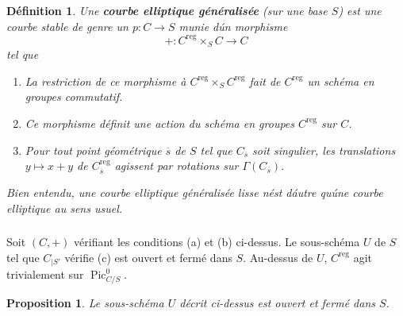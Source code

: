 \documentclass{amsart}
\theoremstyle{plain}
\newtheorem{proposition}[theorem]{Proposition}
\newtheorem{definition}[theorem]{D\'efinition}
\theoremstyle{remark}
\DeclareMathOperator{\Pic}{Pic}
\begin{document}
\begin{definition}
Une \textbf{courbe elliptique g\'en\'eralis\'ee} (sur une base $S$) est une courbe stable
de genre un $p: C \to S$ munie d\'un morphisme
\begin{equation}
+: C^{\mathrm{reg}} \times_S C \to C
\end{equation}
tel que
\begin{enumerate}
\item[(a)] La restriction de ce morphisme \`a $C^{\mathrm{reg}} \times_S C^{\mathrm{reg}}$ fait de
$C^{\mathrm{reg}}$ un sch\'ema en groupes commutatif.
\item[(b)] Ce morphisme d\'efinit une action du sch\'ema en groupes $C^{\mathrm{reg}}$ sur $C$.
\item[(c)] Pour tout point g\'eom\'etrique $\overline{s}$ de $S$ tel que $C_{\overline{s}}$ soit
singulier, les translations $y \mapsto x+y$ de $C_{\overline{s}}^{\mathrm{reg}}$ agissent par rotations
sur $\Gamma(C_{\overline{s}})$.
\end{enumerate}
Bien entendu, une courbe elliptique g\'en\'eralis\'ee lisse n\'est d\'autre qu\'une courbe
elliptique au sens usuel.
\end{definition}

\subsubsection{}
Soit $(C,+)$ v\'erifiant les conditions (a) et (b) ci-dessus. Le sous-sch\'ema $U$ de
$S$ tel que $C_{|S'}$ v\'erifie (c) est ouvert et ferm\'e dans $S$. Au-dessus de $U$,
$C^{\mathrm{reg}}$ agit trivialement sur $\Pic^0_{C/S}$.

\begin{proposition}
Le sous-sch\'ema $U$ d\'ecrit ci-dessus est ouvert et ferm\'e dans $S$.
\end{proposition}
\end{document}
